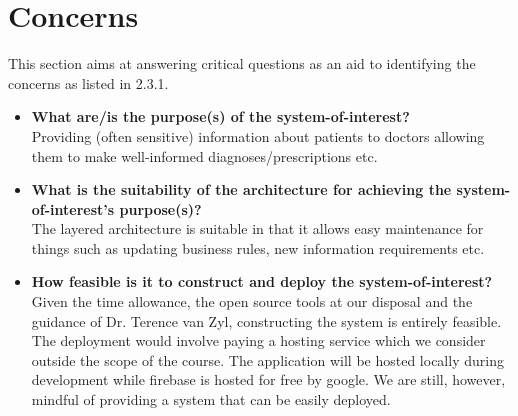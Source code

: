 \documentclass[10pt,oneside]{report}
\begin{document}
\section{Concerns}\label{ad:concerns}

This section aims at answering critical questions as an aid to identifying the concerns as listed in 2.3.1.

\begin{itemize}
\item \textbf{What are/is the purpose(s) of the system-of-interest?} \\
Providing (often sensitive) information about patients to doctors allowing them to make well-informed diagnoses/prescriptions etc.

\item \textbf{What is the suitability of the architecture for achieving the system-of-interest's purpose(s)?} \\
The layered architecture is suitable in that it allows easy maintenance for things such as updating business rules, new information requirements etc.

\item \textbf{How feasible is it to construct and deploy the system-of-interest?} \\
Given the time allowance, the open source tools at our disposal and the guidance of Dr. Terence van Zyl, constructing the system is entirely feasible. The deployment would involve paying a hosting service which we consider outside the scope of the course. The application will be hosted locally during development while firebase is hosted for free by google. We are still, however, mindful of providing a system that can be easily deployed.


\end{itemize}
\end{document}
